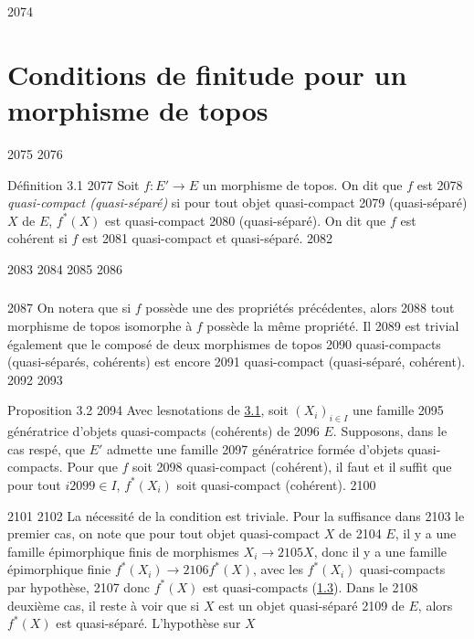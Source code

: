   2074	\section{Conditions de finitude pour un morphisme de topos}
  2075	
  2076	\begin{enonce*}{Définition 3.1}
  2077	Soit $f : E'\to E$ un morphisme de topos. On dit que $f$ est
  2078	\emph{quasi-compact (\resp quasi-séparé)} si pour tout objet quasi-compact
  2079	(\resp quasi-séparé) $X$ de $E$, $f^{\ast} (X)$ est quasi-compact
  2080	(\resp quasi-séparé). On dit que $f$ est cohérent si $f$ est
  2081	quasi-compact et quasi-séparé.
  2082	\end{enonce*}
  2083	
  2084	\setcounter{subsection}{1}
  2085	\setcounter{subsubsection}{0}
  2086	\subsubsection{}
  2087	On notera que si $f$ possède une des propriétés précédentes, alors
  2088	tout morphisme de topos isomorphe à $f$ possède la même propriété. Il
  2089	est trivial également que le composé de deux morphismes de topos
  2090	quasi-compacts (\resp quasi-séparés, \resp cohérents) est encore
  2091	quasi-compact (\resp quasi-séparé, \resp cohérent).
  2092	
  2093	\begin{enonce*}{Proposition 3.2}
  2094	Avec les\pageoriginale notations de \hyperref[VI.def3.1]{3.1}, soit $(X_i)_{i \in I}$ une famille
  2095	génératrice d'objets quasi-compacts (\resp cohérents) de
  2096	$E$. Supposons, dans le cas respé, que $E'$ admette une famille
  2097	génératrice formée d'objets quasi-compacts. Pour que $f$ soit
  2098	quasi-compact (\resp cohérent), il faut et il suffit que pour tout $i
  2099	\in I$, $f^{\ast}(X_i)$ soit quasi-compact (\resp cohérent).
  2100	\end{enonce*}
  2101	
  2102	La nécessité de la condition est triviale. Pour la suffisance dans
  2103	le premier cas, on note que pour tout objet quasi-compact $X$ de
  2104	$E$, il y a une famille épimorphique finis de morphismes $X_i \to
  2105	X$, donc il y a une famille épimorphique finie $f^{\ast} (X_i) \to
  2106	f^{\ast}(X)$, avec les $f^{\ast}(X_i)$ quasi-compacts par hypothèse,
  2107	donc $f^{\ast}(X)$ est quasi-compacts (\hyperref[VI.prop1.3]{1.3}). Dans le
  2108	deuxième cas, il reste à voir que si $X$ est un objet quasi-séparé
  2109	de $E$, alors $f^{\ast}(X)$ est quasi-séparé. L'hypothèse sur $X$
